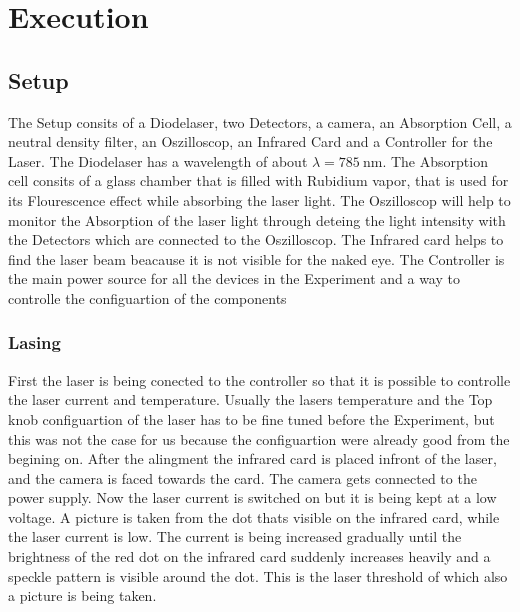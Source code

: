 \section{Execution}
\label{sec:Durchführung}

\subsection{Setup}
The Setup consits of a Diodelaser, two Detectors, a camera, an Absorption Cell, a neutral density filter, an Oszilloscop, an Infrared Card and a Controller for the Laser.
The Diodelaser has a wavelength of about $\lambda = \SI{785}{\nano\meter}$.
The Absorption cell consits of a glass chamber that is filled with Rubidium vapor, that is used for its Flourescence effect while absorbing the laser light.
The Oszilloscop will help to monitor the Absorption of the laser light through deteing the light intensity with the Detectors which are connected to the Oszilloscop.
The Infrared card helps to find the laser beam beacause it is not visible for the naked eye.
The Controller is the main power source for all the devices in the Experiment and a way to controlle the configuartion of the components

\subsubsection{Lasing}
First the laser is being conected to the controller so that it is possible to controlle the laser current and temperature.
Usually the lasers temperature and the Top knob configuartion of the laser has to be fine tuned before the Experiment, but this was not the case for us because the configuartion were already good from the begining on.
After the alingment the infrared card is placed infront of the laser, and the camera is faced towards the card.
The camera gets connected to the power supply.
Now the laser current is switched on but it is being kept at a low voltage.
A picture is taken from the dot thats visible on the infrared card, while the laser current is low.
The current is being increased gradually until the brightness of the red dot on the infrared card suddenly increases heavily and a speckle pattern is visible around the dot.
This is the laser threshold of which also a picture is being taken.

